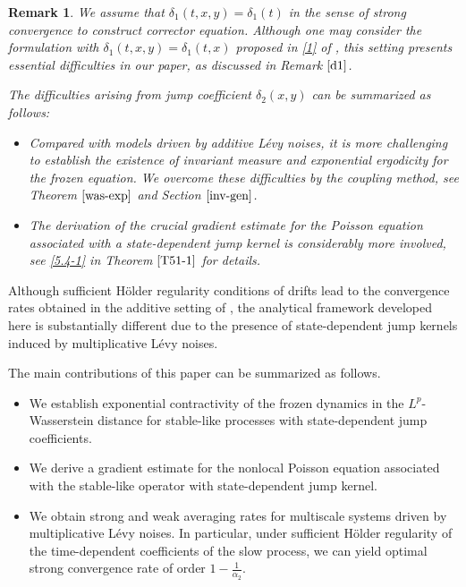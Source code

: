 \documentclass[11pt,reqno]{amsart}
\newtheorem{remark}{\indent Remark}[section]
\numberwithin{equation}{section}
\newcommand{\de}{\delta}
\begin{document}
\begin{remark}\label{d1-d2}
We assume that $\delta_{1}(t,x,y)=\delta_{1}(t)$ in the sense of strong convergence to construct corrector equation. Although one may consider the formulation with $\delta_{1}(t,x,y)=\delta_{1}(t,x)$ proposed in \eqref{1} of \cite{LRSX}, this setting presents essential difficulties in our paper, as discussed in Remark $\ref{d1}$.

The difficulties arising from jump coefficient $\de_{2}(x,y)$ can be summarized as follows:
\begin{itemize}
    \item[(i)] Compared with models driven by additive Lévy noises, it is more challenging to establish the existence of  invariant measure and exponential ergodicity for the frozen equation.
We overcome these difficulties by the coupling method, see  Theorem $\ref{was-exp}$ and Section $\ref{inv-gen}$.
\item[(ii)] The derivation of the crucial gradient estimate for the Poisson equation associated with a state-dependent jump kernel is considerably more involved, see \eqref{5.4-1} in Theorem $\ref{T51-1}$ for details.
\end{itemize}
\end{remark}

Although sufficient  Hölder regularity conditions of drifts lead to the convergence rates obtained in the additive setting of \cite{SXX}, 
the analytical framework developed here is substantially different due to the presence of state-dependent jump kernels induced by multiplicative Lévy noises.

The main contributions of this paper can be summarized as follows.
\begin{itemize}
    \item We establish exponential contractivity of the frozen dynamics in the $L^p$-Wasserstein distance for stable-like processes with state-dependent jump coefficients.
    
    \item We derive a gradient estimate for the nonlocal Poisson equation associated with the stable-like operator with state-dependent jump kernel.
     
    \item We obtain strong and weak averaging rates for multiscale systems driven by multiplicative Lévy noises. In particular, under sufficient H\"{o}lder regularity of the time-dependent coefficients of the slow process, we ‌can yield optimal strong convergence rate of order $1-\frac{1}{\alpha_{2}}$.
\end{itemize}
\end{document}
